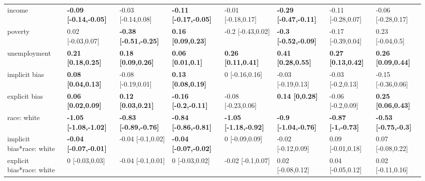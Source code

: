 \documentclass[]{article}
\theoremstyle{definition}
\theoremstyle{definition}
\theoremstyle{remark}
\begin{document}
\begin{landscape}
\begin{table}
{\begin{tabular}[t]{llllllll}
income & \textbf{-0.09 [-0.14,-0.05]} & -0.03 [-0.14,0.08] & \textbf{-0.11 [-0.17,-0.05]} & -0.01 [-0.18,0.17] & \textbf{-0.29 [-0.47,-0.11]} & -0.11 [-0.28,0.07] & -0.06 [-0.28,0.17]\\
poverty & 0.02 [-0.03,0.07] & \textbf{-0.38 [-0.51,-0.25]} & \textbf{0.16 [0.09,0.23]} & -0.2 [-0.43,0.02] & \textbf{-0.3 [-0.52,-0.09]} & -0.17 [-0.39,0.04] & 0.23 [-0.04,0.5]\\
unemployment & \textbf{0.21 [0.18,0.25]} & \textbf{0.18 [0.09,0.26]} & \textbf{0.06 [0.01,0.1]} & \textbf{0.26 [0.11,0.41]} & \textbf{0.41 [0.28,0.55]} & \textbf{0.27 [0.13,0.42]} & \textbf{0.26 [0.09,0.44]}\\
implicit bias & \textbf{0.08 [0.04,0.13]} & -0.08 [-0.19,0.01] & \textbf{0.13 [0.08,0.19]} & 0 [-0.16,0.16] & -0.03 [-0.19,0.13] & -0.03 [-0.2,0.13] & -0.15 [-0.36,0.06]\\
\addlinespace
explicit bias & \textbf{0.06 [0.02,0.09]} & \textbf{0.12 [0.03,0.21]} & \textbf{-0.16 [-0.2,-0.11]} & -0.08 [-0.23,0.06] & \textbf{0.14 [0,0.28]} & -0.06 [-0.2,0.09] & \textbf{0.25 [0.06,0.43]}\\
race: white & \textbf{-1.05 [-1.08,-1.02]} & \textbf{-0.83 [-0.89,-0.76]} & \textbf{-0.84 [-0.86,-0.81]} & \textbf{-1.05 [-1.18,-0.92]} & \textbf{-0.9 [-1.04,-0.76]} & \textbf{-0.87 [-1,-0.73]} & \textbf{-0.53 [-0.75,-0.3]}\\
implicit bias*race: white & \textbf{-0.04 [-0.07,-0.01]} & -0.04 [-0.1,0.02] & \textbf{-0.04 [-0.07,-0.02]} & 0 [-0.09,0.09] & -0.02 [-0.12,0.09] & 0.09 [-0.01,0.18] & 0.07 [-0.08,0.22]\\
explicit bias*race: white & 0 [-0.03,0.03] & -0.04 [-0.1,0.01] & 0 [-0.03,0.02] & -0.02 [-0.1,0.07] & 0.02 [-0.08,0.12] & 0.04 [-0.05,0.12] & 0.02 [-0.11,0.16]\\
\bottomrule
\end{tabular}}
\end{table}
\end{landscape}
\end{document}
